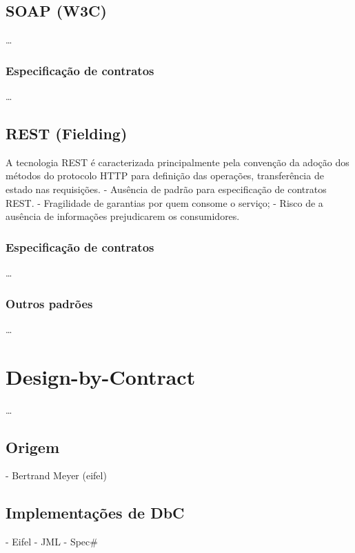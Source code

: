 \subsection{SOAP (W3C) }
\vspace{-6mm}

\ldots

\subsubsection{Especificação de contratos}
\vspace{-6mm}

\ldots

\vspace{-6mm}

\subsection{REST (Fielding)}
\label{secaoREST}
\vspace{-6mm}

A tecnologia REST é caracterizada principalmente pela
convenção da adoção dos métodos do protocolo HTTP para definição das operações, transferência de estado nas requisições.
- Ausência de padrão para especificação de contratos REST.
- Fragilidade de garantias por quem consome o serviço;
- Risco de a ausência de informações prejudicarem os consumidores.

\subsubsection{Especificação de contratos}
\vspace{-6mm}

\ldots


\subsubsection{Outros padrões }
\vspace{-6mm}

\ldots

\section{Design-by-Contract}
\label{Design-by-Contract}
\vspace{-6mm}

\ldots

\subsection{Origem}
\vspace{-6mm}

- Bertrand Meyer (eifel)

\subsection{Implementações de DbC}

 - Eifel
 - JML
 - Spec\#


